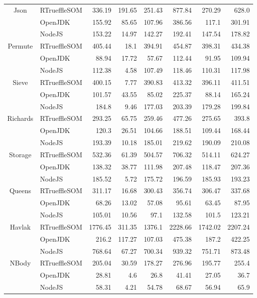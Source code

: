 \begin{center}
\begin{tabular}{ c | l r r r r r r}
\multirow{3}{*}{ Json } & RTrueffleSOM & 336.19 & 191.65 & 251.43 & 877.84 & 270.29 & 628.0 \\
& OpenJDK & 155.92 & 85.65 & 107.96 & 386.56 & 117.1 & 301.91 \\
& NodeJS & 153.22 & 14.97 & 142.27 & 192.41 & 147.54 & 178.82 \\
\midrule

\multirow{3}{*}{ Permute } & RTrueffleSOM & 405.44 & 18.1 & 394.91 & 454.87 & 398.31 & 434.38 \\
& OpenJDK & 88.94 & 17.72 & 57.67 & 112.44 & 91.95 & 109.94 \\
& NodeJS & 112.38 & 4.58 & 107.49 & 118.46 & 110.31 & 117.98 \\
\midrule

\multirow{3}{*}{ Sieve } & RTrueffleSOM & 400.15 & 7.77 & 390.83 & 413.32 & 396.11 & 411.51 \\
& OpenJDK & 101.57 & 43.55 & 85.02 & 225.37 & 88.14 & 165.24 \\
& NodeJS & 184.8 & 9.46 & 177.03 & 203.39 & 179.28 & 199.84 \\
\midrule

\multirow{3}{*}{ Richards } & RTrueffleSOM & 293.25 & 65.75 & 259.46 & 477.26 & 275.65 & 393.8 \\
& OpenJDK & 120.3 & 26.51 & 104.66 & 188.51 & 109.44 & 168.44 \\
& NodeJS & 193.39 & 10.18 & 185.01 & 219.62 & 190.09 & 210.08 \\
\midrule

\multirow{3}{*}{ Storage } & RTrueffleSOM & 532.36 & 61.39 & 504.57 & 706.32 & 514.11 & 624.27 \\
& OpenJDK & 138.32 & 38.77 & 111.98 & 207.48 & 118.47 & 207.36 \\
& NodeJS & 185.52 & 5.72 & 175.72 & 196.59 & 185.93 & 193.23 \\
\midrule

\multirow{3}{*}{ Queens } & RTrueffleSOM & 311.17 & 16.68 & 300.43 & 356.74 & 306.47 & 337.68 \\
& OpenJDK & 68.26 & 13.02 & 57.08 & 95.61 & 63.45 & 87.95 \\
& NodeJS & 105.01 & 10.56 & 97.1 & 132.58 & 101.5 & 123.21 \\
\midrule

\multirow{3}{*}{ Havlak } & RTrueffleSOM & 1776.45 & 311.35 & 1376.1 & 2228.66 & 1742.02 & 2207.24 \\
& OpenJDK & 216.2 & 117.27 & 107.03 & 475.38 & 187.2 & 422.25 \\
& NodeJS & 768.64 & 67.27 & 700.34 & 939.32 & 751.71 & 873.48 \\
\midrule

\multirow{3}{*}{ NBody } & RTrueffleSOM & 205.04 & 30.59 & 178.27 & 276.96 & 195.77 & 255.4 \\
& OpenJDK & 28.81 & 4.6 & 26.8 & 41.41 & 27.05 & 36.7 \\
& NodeJS & 58.31 & 4.21 & 54.78 & 68.67 & 56.94 & 65.9 \\
\midrule

\end{tabular}
\end{center}